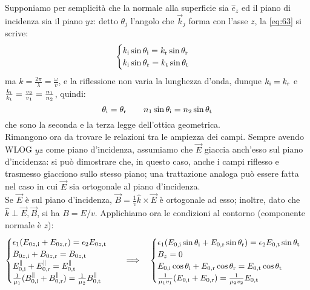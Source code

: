 \documentclass[]{article}
\begin{document}
%
Supponiamo per semplicità che la normale alla superficie sia $ \hat{e}_z $ ed il piano di incidenza sia il piano $ yz $: detto $ \theta_j $ l'angolo che $ \vec{k}_j $ forma con l'asse $ z $, la \ref{eq:63} si scrive:
\begin{equation}
	\begin{cases}
		k_{\text{i}} \sin\theta_{\text{i}} = k_{\text{r}} \sin\theta_{\text{r}} \\ 
		k_{\text{i}} \sin\theta_{\text{r}} = k_{\text{t}} \sin\theta_{\text{t}}
	\end{cases}
	\label{eq:64}
\end{equation}
ma $ k = \frac{2\pi}{\lambda} = \frac{\omega}{v} $, e la riflessione non varia la lunghezza d'onda, dunque $ k_{\text{i}} = k_{\text{r}} $ e $ \frac{k_{\text{i}}}{k_{\text{t}}} = \frac{v_2}{v_1} = \frac{n_1}{n_2} $, quindi:
\begin{equation}
	\theta_{\text{i}} = \theta_{\text{r}} \qquad n_1 \sin\theta_{\text{i}} = n_2 \sin\theta_{\text{t}}
	\label{eq:65}
\end{equation}
che sono la seconda e la terza legge dell'ottica geometrica. \\ 
%
Rimangono ora da trovare le relazioni tra le ampiezza dei campi. Sempre avendo WLOG $ yz $ come piano d'incidenza, assumiamo che $ \vec{E} $ giaccia anch'esso sul piano d'incidenza: si può dimostrare che, in questo caso, anche i campi riflesso e trasmesso giacciono sullo stesso piano; una trattazione analoga può essere fatta nel caso in cui $ \vec{E} $ sia ortogonale al piano d'incidenza. \\ 
Se $ \vec{E} $ è sul piano d'incidenza, $ \vec{B} = \frac{1}{v} \hat{k}\times\vec{E} $ è ortogonale ad esso; inoltre, dato che $ \hat{k}\perp\vec{E},\vec{B} $, si ha $ B = E / v $. Applichiamo ora le condizioni al contorno (componente normale è $ z $):
\begin{equation}
	\begin{cases}
		\epsilon_1 (E_{0z,\text{i}} + E_{0z,\text{r}}) = \epsilon_2 E_{0z,\text{t}} \\ 
		B_{0z,\text{i}} + B_{0z,\text{r}} = B_{0z,\text{t}} \\ 
		E^{\parallel}_{0,\text{i}} + E^{\parallel}_{0,\text{r}} = E^{\parallel}_{0,\text{t}} \\ 
		\frac{1}{\mu_1}(B^{\parallel}_{0,\text{i}} + B^{\parallel}_{0,\text{r}}) = \frac{1}{\mu_2}B^{\parallel}_{0,\text{t}}
	\end{cases}
	\quad\Longrightarrow\quad
	\begin{cases}
		\epsilon_1 (E_{0,\text{i}}\sin\theta_{\text{i}} + E_{0,\text{r}}\sin\theta_{\text{r}}) = \epsilon_2 E_{0,\text{t}}\sin\theta_{\text{t}} \\ 
		B_z = 0 \\ 
		E_{0,\text{i}} \cos\theta_{\text{i}} + E_{0,\text{r}} \cos\theta_{\text{r}} = E_{0,\text{t}} \cos\theta_{\text{t}} \\ 
		\frac{1}{\mu_1 v_1}(E_{0,\text{i}} + E_{0,\text{r}}) = \frac{1}{\mu_2 v_2}E_{0,\text{t}}
	\end{cases}
	\label{eq:66}
\end{equation}
\end{document}
